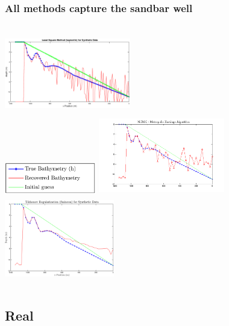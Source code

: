 \documentclass[7pt]{beamer}
\begin{document}
\begin{frame}
	\frametitle{All methods capture the sandbar well}
	   \begin{columns}[t]
        \centering
        \includegraphics[width=5.5cm,height=3.5cm]{img/lsqnonlin_simulated_10m_new.eps}\\
        \includegraphics[width=4.0cm,height=1.5cm]{img/legend_simulated.png}
        \centering
       \includegraphics[width=5.5cm,height=3.5cm]{img/MCMC-manufactured_new.png}\\
       \includegraphics[width=4.8cm,height=3.5cm]{img/fmincon_simulated_25m.png}
      \end{columns}
\end{frame}

\subsection{Real}
\end{document}

